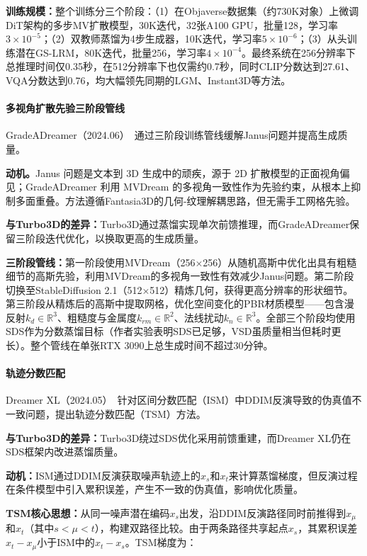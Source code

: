\textbf{训练规模：}整个训练分三个阶段：（1）在Objaverse数据集（约730K对象）上微调DiT架构的多步MV扩散模型，30K迭代，32张A100 GPU，批量128，学习率$3 \times 10^{-5}$；（2）双教师蒸馏为4步生成器，10K迭代，学习率$5 \times 10^{-6}$；（3）从头训练潜在GS-LRM，80K迭代，批量256，学习率$4 \times 10^{-4}$。最终系统在256分辨率下总推理时间仅0.35秒，在512分辨率下也仅需约0.7秒，同时CLIP分数达到27.61、VQA分数达到0.76，均大幅领先同期的LGM、Instant3D等方法。

\paragraph{多视角扩散先验三阶段管线}

GradeADreamer（2024.06）~\cite{2406_09850}通过三阶段训练管线缓解Janus问题并提高生成质量。

\textbf{动机。}Janus 问题是文本到 3D 生成中的顽疾，源于 2D 扩散模型的正面视角偏见；GradeADreamer 利用 MVDream 的多视角一致性作为先验约束，从根本上抑制多面重叠。方法遵循Fantasia3D的几何-纹理解耦思路，但无需手工网格先验。

\textbf{与Turbo3D的差异：}Turbo3D通过蒸馏实现单次前馈推理，而GradeADreamer保留三阶段迭代优化，以换取更高的生成质量。

\textbf{三阶段管线：}第一阶段使用MVDream（256$\times$256）从随机高斯中优化出具有粗糙细节的高斯先验，利用MVDream的多视角一致性有效减少Janus问题。第二阶段切换至StableDiffusion 2.1（512$\times$512）精炼几何，获得更高分辨率的形状细节。第三阶段从精炼后的高斯中提取网格，优化空间变化的PBR材质模型——包含漫反射$k_d \in \mathbb{R}^3$、粗糙度与金属度$k_{rm} \in \mathbb{R}^2$、法线扰动$k_n \in \mathbb{R}^3$。全部三个阶段均使用SDS作为分数蒸馏目标（作者实验表明SDS已足够，VSD虽质量相当但耗时更长）。整个管线在单张RTX 3090上总生成时间不超过30分钟。

\paragraph{轨迹分数匹配}

Dreamer XL（2024.05）~\cite{2405_11252}针对区间分数匹配（ISM）中DDIM反演导致的伪真值不一致问题，提出轨迹分数匹配（TSM）方法。

\textbf{与Turbo3D的差异：}Turbo3D绕过SDS优化采用前馈重建，而Dreamer XL仍在SDS框架内改进蒸馏质量。

\textbf{动机：}ISM通过DDIM反演获取噪声轨迹上的$x_s$和$x_t$来计算蒸馏梯度，但反演过程在条件模型中引入累积误差，产生不一致的伪真值，影响优化质量。

\textbf{TSM核心思想：}从同一噪声潜在编码$x_s$出发，沿DDIM反演路径同时前推得到$x_\mu$和$x_t$（其中$s < \mu < t$），构建双路径比较。由于两条路径共享起点$x_s$，其累积误差$x_t - x_\mu$小于ISM中的$x_t - x_s$。TSM梯度为：

